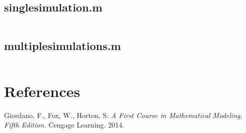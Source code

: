 \documentclass{article}
\begin{document}
    \subsection*{singlesimulation.m}
    \inputminted[linenos,breaklines]{matlab}{matlab/singlesimulation.m}
    \subsection*{multiplesimulations.m}
    \inputminted[linenos,breaklines]{matlab}{matlab/multiplesimulations.m}
    \pagebreak
    \section*{References}
    Giordano, F., Fox, W., Horton, S. \emph{A First Course in Mathematical Modeling, Fifth Edition.} Cengage Learning. 2014.
\end{document}
